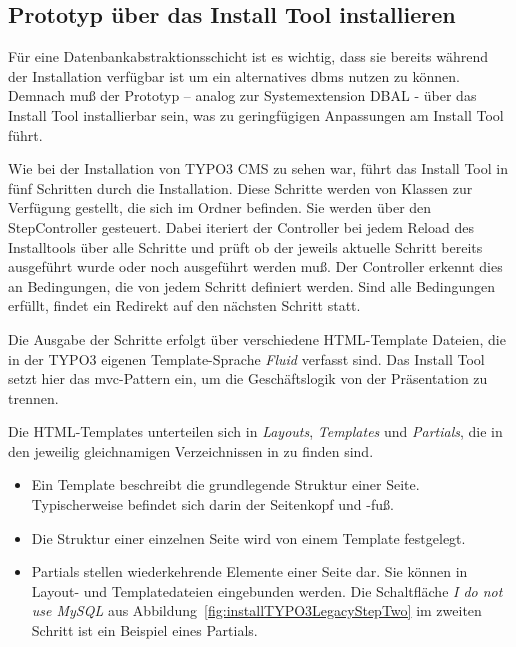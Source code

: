 {

\subsection{Prototyp über das Install Tool installieren}
Für eine Datenbankabstraktionsschicht ist es wichtig, dass sie bereits während der Installation verfügbar ist um ein alternatives \gls{dbms} nutzen zu können. Demnach muß der Prototyp – analog zur Systemextension DBAL - über das Install Tool installierbar sein, was zu geringfügigen Anpassungen am Install Tool führt.

Wie bei der Installation von TYPO3 CMS zu sehen war, führt das Install Tool in fünf Schritten durch die Installation. Diese Schritte werden von Klassen zur Verfügung gestellt, die sich im Ordner  befinden. Sie werden über den StepController  gesteuert. Dabei iteriert der Controller bei jedem Reload des Installtools über alle Schritte und prüft ob der jeweils aktuelle Schritt bereits ausgeführt wurde oder noch ausgeführt werden muß. Der Controller erkennt dies an Bedingungen, die von jedem Schritt definiert werden.
Sind alle Bedingungen erfüllt, findet ein Redirekt auf den nächsten Schritt statt.

Die Ausgabe der Schritte erfolgt über verschiedene HTML-Template Dateien, die in der TYPO3 eigenen Template-Sprache \textit{Fluid} verfasst sind. Das Install Tool setzt hier das \gls{mvc}-Pattern ein, um die Geschäftslogik von der Präsentation zu trennen.

Die HTML-Templates unterteilen sich in \textit{Layouts}, \textit{Templates} und \textit{Partials}, die in den jeweilig gleichnamigen Verzeichnissen in  zu finden sind.

\begin{itemize}
	\item Ein Template beschreibt die grundlegende Struktur einer Seite. Typischerweise befindet sich darin der Seitenkopf und -fuß.
	\item Die Struktur einer einzelnen Seite wird von einem Template festgelegt.
	\item  Partials stellen wiederkehrende Elemente einer Seite dar. Sie können in Layout- und Templatedateien eingebunden werden. Die Schaltfläche \textit{I do not use MySQL} aus Abbildung~\ref{fig:installTYPO3LegacyStepTwo} im zweiten Schritt ist ein Beispiel eines Partials.


\end{itemize}}
